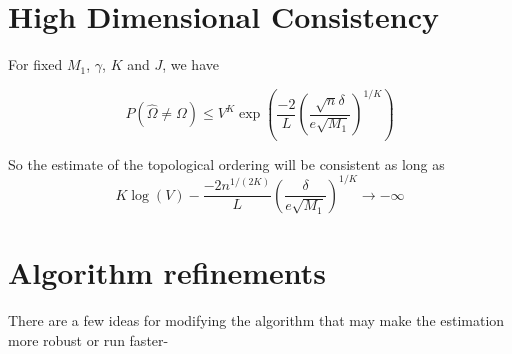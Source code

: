 \documentclass[]{article}
\begin{document}
\section{High Dimensional Consistency}
For fixed $M_1$, $\gamma$, $K$ and $J$, we have

\begin{equation}
P(\hat \Omega \neq \Omega) \leq V^K \exp\left(\frac{-2}{L} \left(\frac{\sqrt{n}\delta}{e\sqrt{M_1}}\right)^{1/K}\right)
\end{equation}

So the estimate of the topological ordering will be consistent as long as
\begin{equation}
K \log(V) - \frac{-2n^{1/(2K)}}{L} \left(\frac{\delta}{e\sqrt{M_1}}\right)^{1/K} \rightarrow -\infty
\end{equation}


\section{Algorithm refinements}


There are a few ideas for modifying the algorithm that may make the estimation more robust or run faster-
\end{document}
